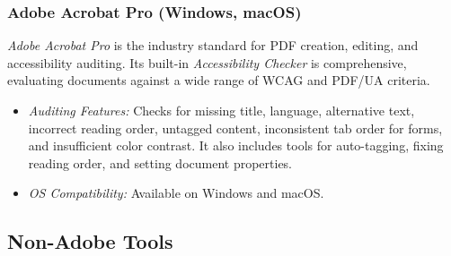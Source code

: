 \subsubsection{Adobe Acrobat Pro (Windows, macOS)}
\label{subsubsec:acrobat-pro}
\emph{Adobe Acrobat Pro} is the industry standard for PDF creation, editing, and accessibility auditing. Its built-in \emph{Accessibility Checker} is comprehensive, evaluating documents against a wide range of WCAG and PDF/UA criteria.
\begin{itemize}
\item \emph{Auditing Features:} Checks for missing title, language, alternative text, incorrect reading order, untagged content, inconsistent tab order for forms, and insufficient color contrast.\cite{AdobeAccessGuide} It also includes tools for auto-tagging, fixing reading order, and setting document properties.
\item \emph{OS Compatibility:} Available on Windows and macOS.
\end{itemize}

\subsection{Non-Adobe Tools}
\label{subsec:non-adobe-tools}
